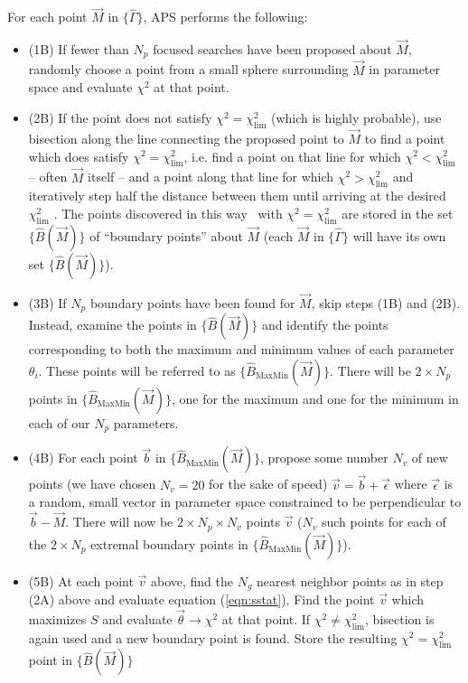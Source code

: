 \documentclass[useAMS,usenatbib]{aastex}
\begin{document}
For each point $\vec{M}$ in $\{\hat{\Gamma}\}$, APS performs the following:
\begin{itemize}
\item (1B) If fewer than $N_p$ focused searches have been proposed about $\vec{M}$, 
randomly choose a point from a small sphere surrounding $\vec{M}$ in parameter space and 
evaluate $\chi^2$ at that point.  
\\
\item(2B) If the point does not satisfy $\chi^2=\chi^2_\text{lim}$ (which is highly probable), 
use bisection
along the line connecting the proposed point to $\vec{M}$ to find a point which does
satisfy $\chi^2=\chi^2_\text{lim}$, i.e. find a point on that line for which
$\chi^2<\chi^2_\text{lim}$ -- often $\vec{M}$ itself -- and a point along that line
for which $\chi^2>\chi^2_\text{lim}$ and iteratively step half the distance between them until
arriving at the desired $\chi^2_\text{lim}$ \cite{minuit}.  The points discovered in this way \
with $\chi^2=\chi^2_\text{lim}$ are stored in the set $\{\hat{B}(\vec{M})\}$ of 
``boundary points'' about $\vec{M}$ (each $\vec{M}$ in $\{\hat{\Gamma}\}$ will have its own
set $\{\hat{B}(\vec{M})\}$).  
\\
\item(3B) If $N_p$ boundary points have been found for $\vec{M}$, skip steps (1B) and (2B).
Instead, examine the points in $\{\hat{B}(\vec{M})\}$ and identify the points
corresponding to both the maximum and minimum values of each parameter $\theta_i$.  These
points will be referred to as $\{\hat{B}_\text{MaxMin}(\vec{M})\}$.  
There will be $2\times N_p$ points in $\{\hat{B}_\text{MaxMin}(\vec{M})\}$, one for
the maximum and one for the minimum in each of our $N_p$ parameters.  
\\
\item(4B) For each point $\vec{b}$ in $\{\hat{B}_\text{MaxMin}(\vec{M})\}$, 
propose some number $N_v$ of new points (we have chosen
$N_v=20$ for the sake of speed) $\vec{v} = \vec{b}+\vec{\epsilon}$ where $\vec{\epsilon}$ is a
random, small vector in parameter space constrained to be perpendicular to
$\vec{b}-\vec{M}$.  There will now be $2\times N_p \times N_v$ points $\vec{v}$
($N_v$ such points for each of the $2\times N_p$ extremal boundary points in
$\{\hat{B}_\text{MaxMin}(\vec{M})\}$).
\\
\item(5B) At each point $\vec{v}$ above, find the $N_g$ nearest neighbor points as in step (2A) above
and evaluate equation (\ref{eqn:sstat}).  
Find the point $\vec{v}$ which maximizes $S$ and evaluate $\vec{\theta}\rightarrow\chi^2$ at
that point.  If
$\chi^2 \neq \chi^2_\text{lim}$, bisection is again used and a new boundary point is found.
Store the resulting $\chi^2=\chi^2_\text{lim}$ point in $\{\hat{B}(\vec{M})\}$
\end{itemize}
\end{document}
